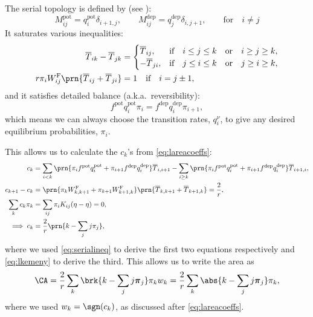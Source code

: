 \documentclass[12pt]{article}
\newcommand{\eqm}{\pi}
\newcommand{\eq}{\boldsymbol{\eqm}}
\newcommand{\fptm}{T}
\newcommand{\fptbm}{\overline{\fptm}}
\newcommand{\wm}{w}
\newcommand{\w}{\mathbf{\wm}}
\newcommand{\Wm}{W}
\newcommand{\MMdm}{M}
\newcommand{\encm}{K}
\newcommand{\frgm}{\Wm^{\mathrm{F}}}
\newcommand{\pot}{^{\text{pot}}}
\newcommand{\dep}{^{\text{dep}}}
\begin{document}
The serial topology is defined by (see \cite{Leibold2008serial,Ben-DayanRubin2007sparse}):
%
\begin{equation}\label{eq:serialdef}
  \MMdm\pot_{ij} = q\pot_i \delta_{i+1,j},
  \qquad
  \MMdm\dep_{ij} = q\dep_j \delta_{i,j+1},
  \qquad \text{for}\quad i \neq j
\end{equation}
%
It saturates various inequalities:
%
\begin{equation}\label{eq:serialineq}
  \begin{aligned}
    \fptbm_{ik} - \fptbm_{jk} &=
      \begin{cases}
        \fptbm_{ij},  &\text{if}\quad i \leq j \leq k \quad\text{or}\quad i \geq j \geq k,\\
        -\fptbm_{ji}, &\text{if}\quad j \leq i \leq k \quad\text{or}\quad j \geq i \geq k,\\
      \end{cases} \\
    r\eqm_i \frgm_{ij} \prn{\fptbm_{ij}+\fptbm_{ji}} &= 1 \quad\text{if}\quad i=j\pm1,
  \end{aligned}
\end{equation}
%
and it satisfies detailed balance (a.k.a.\ reversibility):
%
\begin{equation}\label{eq:multistateprob}
  f\pot q\pot_i \eqm_i = f\dep q\dep_i \eqm_{i+1},
\end{equation}
%
which means we can always choose the transition rates, $q^\nu_i$, to give any desired equilibrium probabilities, $\eqm_i$.

This allows us to calculate the $c_k$'s from \cref{eq:lareacoeffs}:
%
\begin{equation}\label{eq:serialareacoeff}
\begin{aligned}
  c_k &= \sum_{i<k} \prn{\eqm_{i} f\pot q\pot_i + \eqm_{i+1} f\dep q\dep_i} \fptbm_{i,i+1}
    - \sum_{i\geq k} \prn{\eqm_{i} f\pot q\pot_i + \eqm_{i+1} f\dep q\dep_i} \fptbm_{i+1,i}
  ,\\
  c_{k+1} - c_k &= \prn{\eqm_{k} \frgm_{k,k+1} + \eqm_{k+1} \frgm_{k+1,k}}
                    \prn{\fptbm_{k,k+1} + \fptbm_{k+1,k}}
    = \frac{2}{r},\\
  \sum_k c_k \eqm_k &= \sum_{ij} \eqm_i \encm_{ij} (\eta-\eta) = 0,\\
  \implies c_k &= \frac{2}{r} \prn{k - \sum_j j\eqm_j},
\end{aligned}
\end{equation}
%
where we used \cref{eq:serialineq} to derive the first two equations respectively and \cref{eq:lkemeny} to derive the third. 
This allows us to write the area as
%
\begin{equation}\label{eq:serialarea}
  \CA = \frac{2}{r} \sum_k \brk{k - \sum_j j\eq_j} \eqm_k \wm_k
    = \frac{2}{r} \sum_k \abs{k - \sum_j j\eq_j} \eqm_k ,
\end{equation}
%
where we used $\wm_k=\sgn(c_k)$, as discussed after \cref{eq:lareacoeffs}.
\end{document}

